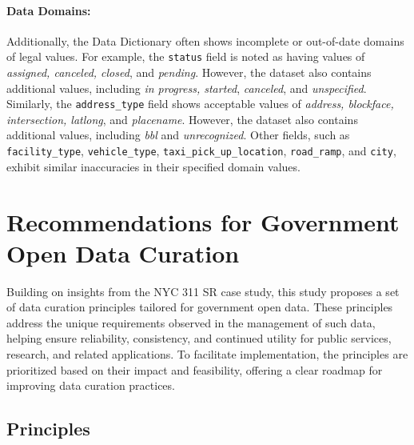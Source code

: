 \documentclass[linenumber]{jdsart}
\begin{document}
\paragraph{Data Domains:} Additionally, the Data Dictionary often 
shows incomplete or out-of-date
domains of legal values. For example, the \texttt{status} field is noted as 
having values of \textit{assigned, canceled, 
closed}, and \textit{pending}. However, the dataset also contains 
additional values, including \textit{in progress, started},
\textit{canceled}, and \textit{unspecified}. Similarly, 
the \texttt{address\_type} field shows acceptable values 
of \textit{address, blockface, intersection, latlong}, 
and \textit{placename}. However, the dataset also 
contains additional values, including \textit{bbl} and \textit{unrecognized}.
Other fields, such as \texttt{facility\_type}, \texttt{vehicle\_type}, 
\texttt{taxi\_pick\_up\_location}, \texttt{road\_ramp}, and \texttt{city}, 
exhibit similar inaccuracies in their specified domain values.


\section{Recommendations for Government Open Data Curation}
\label{sec:recommendations}

Building on insights from the NYC 311 SR case study,
this study proposes a set of data curation principles
tailored for government open data. These principles address 
the unique requirements observed in the management of such data, 
helping ensure reliability, consistency, and continued utility 
for public services, research, and related applications. To facilitate 
implementation, the principles are prioritized based on their 
impact and feasibility, offering a clear roadmap for improving data curation practices.

\subsection{Principles}
\label{subsec:principles}
\end{document}

